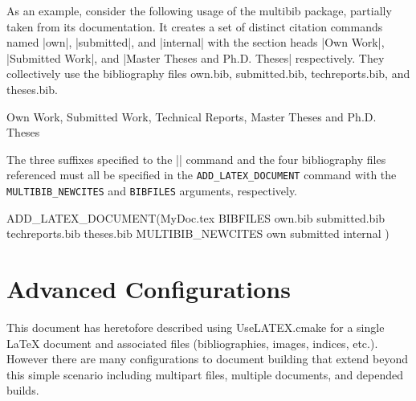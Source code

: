 \documentclass{article}
\newcommand*{\textfile}[1]{\textsf{#1}}
\newcommand*{\textlatexpackage}[1]{\textsf{#1}}
\newcommand*{\textcmake}[1]{\texttt{#1}}
\newcommand*{\UseLATEX}{\textfile{UseLATEX.cmake}\xspace}
\newcommand*{\latex}{\LaTeX\xspace}
\newcommand*{\ald}{\textcmake{ADD\_LATEX\_DOCUMENT}\xspace}
\begin{document}
  As an example, consider the following usage of the
  \textlatexpackage{multibib} package, partially taken from its
  documentation.  It creates a set of distinct citation commands named
  \textlatex|own|, \textlatex|submitted|, and \textlatex|internal| with the
  section heads \textlatex|Own Work|, \textlatex|Submitted Work|, and
  \textlatex|Master Theses and Ph.D. Theses| respectively.  They
  collectively use the bibliography files \textfile{own.bib},
  \textfile{submitted.bib}, \textfile{techreports.bib}, and
  \textfile{theses.bib}.

  \begin{CodeListing}
%
  {Own Work,%
   Submitted Work,%
   {Technical Reports, Master Theses and Ph.D. Theses}}
  \end{CodeListing}
  \begin{CodeListing}
  \end{CodeListing}
  \begin{CodeListing}
  \end{CodeListing}
  \begin{CodeListing}
  \end{CodeListing}

  The three suffixes specified to the \textlatex|\newcite| command and the
  four bibliography files referenced must all be specified in the \ald
  command with the \textcmake{MULTIBIB\_NEWCITES} and \textcmake{BIBFILES}
  arguments, respectively.

  \begin{CodeListing}
ADD_LATEX_DOCUMENT(MyDoc.tex
  BIBFILES own.bib submitted.bib techreports.bib theses.bib
  MULTIBIB_NEWCITES own submitted internal
  )
  \end{CodeListing}


  \section{Advanced Configurations}
  \label{sec:AdvancedConfigurations}

  This document has heretofore described using \UseLATEX for a single
  \latex document and associated files (bibliographies, images, indices,
  etc.).  However there are many configurations to document building that
  extend beyond this simple scenario including multipart files, multiple
  documents, and depended builds.
\end{document}
